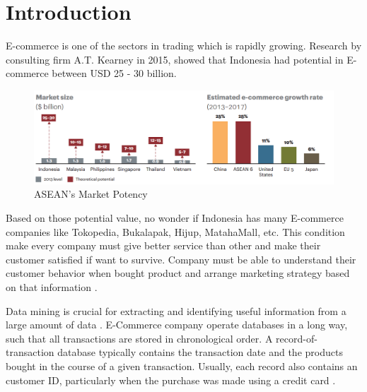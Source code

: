 \documentclass[conference]{IEEEtran}
\begin{document}
%
\IEEEpeerreviewmaketitle



\section{Introduction}
E-commerce is one of the sectors in trading which is rapidly growing. Research by consulting firm A.T. Kearney in 2015, showed that Indonesia had potential in E-commerce between USD
25 - 30 billion.

\begin{figure}[h]
\centering
\includegraphics[width=\columnwidth]{figure/marketpotency}
\caption{ASEAN's Market Potency}
\label{market_potency}
\end{figure}

Based on those potential value, no wonder if Indonesia has many E-commerce companies like Tokopedia, Bukalapak, Hijup, MatahaMall, etc. This condition make every company must give better service than other and make their customer satisfied if want to survive. Company must be able to understand their customer behavior when bought product and arrange marketing strategy based on that information \cite{Tsiptsis}.

Data mining is crucial for extracting and identifying useful information from a large amount of data \cite{Ahmed}. E-Commerce company operate databases in a long way, such that all transactions are stored in chronological order. A record-of-transaction database typically contains the transaction date and the products bought in the course of a given transaction. Usually, each record also contains an customer ID, particularly when the purchase was made using a credit card \cite{Ahmed}.
\end{document}
